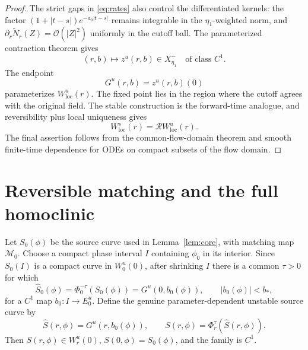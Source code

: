 \documentclass[11pt,reqno]{amsart}
\numberwithin{equation}{section}
\theoremstyle{remark}
\newcommand{\cR}{\mathcal R}
\newcommand{\cM}{\mathcal M}
\newcommand{\cO}{\mathcal O}
\begin{document}
\begin{proof}
The strict gaps in \eqref{eq:rates} also control the differentiated kernels:
the factor $(1+|t-s|)e^{-a_0|t-s|}$ remains integrable in the
$\eta_1$-weighted norm, and $\partial_r\widetilde N_r(Z)=\cO(|Z|^2)$
uniformly in the cutoff ball.  The parameterized contraction theorem gives
\begin{equation}\label{eq:C1-half-orbit}
 (r,b)\longmapsto z^u(r,b)\in X^-_{\eta_1}
 \quad\text{of class }C^1.
\end{equation}
The endpoint
\begin{equation}\label{eq:Gu}
 G^u(r,b)=z^u(r,b)(0)
\end{equation}
parameterizes $W^u_{\mathrm{loc}}(r)$.  The fixed point lies in the region
where the cutoff agrees with the original field.  The stable construction is
the forward-time analogue, and reversibility plus local uniqueness gives
\begin{equation}\label{eq:stable-reversibility}
 W^s_{\mathrm{loc}}(r)=\cR W^u_{\mathrm{loc}}(r).
\end{equation}
The final assertion follows from the common-flow-domain theorem and smooth
finite-time dependence for ODEs on compact subsets of the flow domain.
\end{proof}

\section{Reversible matching and the full homoclinic}\label{sec:matching}

Let $S_0(\phi)$ be the source curve used in Lemma~\ref{lem:core}, with
matching map $\cM_0$.  Choose a compact phase interval $I$ containing
$\phi_0$ in its interior.  Since $S_0(I)$ is a compact curve in
$W^u_0(0)$, after shrinking $I$ there is a common $\tau>0$ for which
\begin{equation}\label{eq:pull-source-back}
 \widehat S_0(\phi)=\Phi_0^{-\tau}(S_0(\phi))
 =G^u(0,b_0(\phi)),
 \qquad |b_0(\phi)|<b_*,
\end{equation}
for a $C^1$ map $b_0:I\to E_0^u$.  Define the genuine
parameter-dependent unstable source curve by
\begin{equation}\label{eq:continued-source}
 \widehat S(r,\phi)=G^u(r,b_0(\phi)),
 \qquad
 S(r,\phi)=\Phi_r^\tau(\widehat S(r,\phi)).
\end{equation}
Then $S(r,\phi)\in W^u_r(0)$, $S(0,\phi)=S_0(\phi)$, and the family is
$C^1$.
\end{document}
